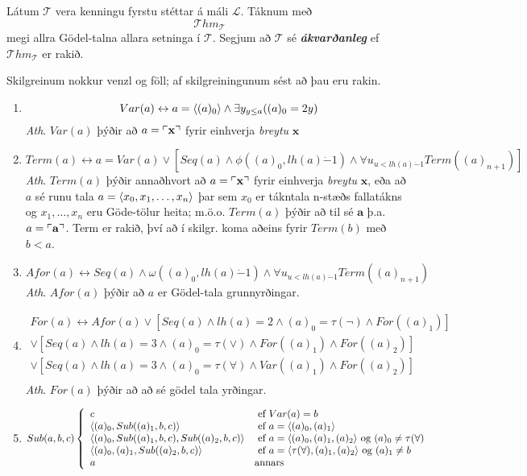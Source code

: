 \documentclass[12pt]{book}
\newcommand{\cT}{\mathcal{T}}
\newcommand{\cL}{\mathcal{L}}
\newcommand{\mc}[1]{\mathcal{#1}}
\newcommand{\ba}{\mathbf{a}}
\newcommand{\bx}{\mathbf{x}}
\newcommand{\xxn}{x_1, \dotsc, x_n}
\newcommand{\dda}{\dot{-}}
\newcommand{\Thm}{{\mc{T}hm}}
\newcommand{\emphs}[1]{\textbf{\emph{#1}}}
\DeclarePairedDelimiter{\god}{\ulcorner}{\urcorner}
\begin{document}
\begin{skgr}
 
  Látum $\cT$ vera kenningu fyrstu stéttar á máli $\cL$. Táknum með
 \[\Thm_{\cT}\]
 megi allra Gödel-talna allara setninga í $\cT$.
 Segjum að $\cT$ sé \emphs{ákvarðanleg} ef $\Thm_{\cT}$
 er rakið.
\end{skgr}

Skilgreinum nokkur venzl og föll; af skilgreiningunum sést
að þau eru rakin.
\begin{enumerate}[(1)]
\item \[Var(a) \leftrightarrow a = \langle(a)_0\rangle \wedge \exists y_{y \leq a} ((a)_0 = 2y)\]
  \emph{Ath}. $Var(a)$ þýðir að $a = \god{\bx}$ fyrir einhverja
  \emph{breytu} $\bx$
\item \[Term(a) \leftrightarrow a = Var(a) \vee [Seq(a) \wedge \phi((a)_0, lh(a) \dda 1) \wedge \forall u_{u < lh(a) \dda 1} Term((a)_{n+1}) ]\]
  \emph{Ath}. $Term(a)$ þýðir annaðhvort að  $a = \god{\bx}$ fyrir einhverja
  \emph{breytu} $\bx$, eða að $a$ sé runu tala $a = \braket{x_0, \xxn}$
  þar sem $x_0$ er tákntala n-stæðs fallatákns og $\xxn$ eru Göde-tölur heita;
  m.ö.o. $Term(a)$ þýðir að til sé $\ba$ þ.a. $a = \god{\ba}$. Term er rakið,
  því að í skilgr. koma aðeins fyrir $Term(b)$ með $b<a$.
\item  \[Afor(a) \leftrightarrow Seq(a) \wedge \omega((a)_0, lh(a) \dda 1) \wedge \forall u_{u < lh(a) \dda 1} Term((a)_{n+1}) \]
  \emph{Ath}. $Afor(a)$ þýðir að $a$ er Gödel-tala grunnyrðingar.

\item 
  \begin{gather*}
    For(a) \leftrightarrow Afor(a) \vee [Seq(a) \wedge lh(a) = 2 \wedge (a)_0 = \tau(\lnot) \wedge For((a)_1) ]\\
    \vee [Seq(a) \wedge lh(a) = 3 \wedge (a)_0 = \tau(\vee) \wedge For((a)_1) \wedge For((a)_2) ]\\
    \vee [Seq(a) \wedge lh(a) = 3 \wedge (a)_0 = \tau(\forall) \wedge Var((a)_1) \wedge For((a)_2) ]\\
  \end{gather*}
  \emph{Ath}. $For(a)$ þýðir að að sé gödel tala yrðingar.
\item 

\[ Sub(a,b,c) \left\{ \begin{array}{l l}
c & \text{ ef } Var(a) = b\\
\langle(a)_0, Sub((a)_1,b,c)\rangle & \text{ ef } a = \langle(a)_0,(a)_1\rangle\\
\langle(a)_0, Sub((a)_1,b,c),Sub((a)_2,b,c)\rangle & \text{ ef } a = \langle(a)_0,(a)_1,(a)_2\rangle \text{ og } (a)_0 \neq \tau(\forall)\\
\langle(a)_0,(a)_1,Sub((a)_2,b,c)\rangle & \text{ ef } a = \langle\tau(\forall),(a)_1,(a)_2\rangle \text{ og } (a)_1 \neq b\\
a & \text{annars}
 \end{array} \right. \]


\end{enumerate}
\end{document}
